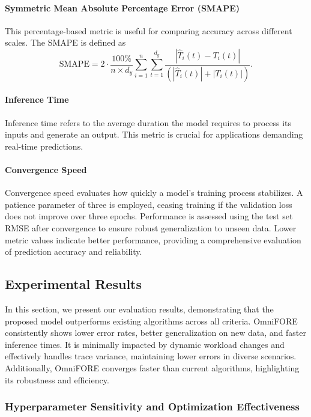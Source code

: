 \paragraph*{Symmetric Mean Absolute Percentage Error (SMAPE)}
This percentage-based metric is useful for comparing accuracy across different scales. The SMAPE is defined as
\begin{equation}
  \text{SMAPE} = 2 \cdot \frac{100\%}{n \times d_y} \sum_{i=1}^{n} \sum_{t=1}^{d_y} \frac{\left| \hat{T}_i(t) - T_i(t) \right|}{\left( \left| \hat{T}_i(t) \right| + \left| T_i(t) \right| \right)}.
\end{equation}

\paragraph*{Inference Time}
Inference time refers to the average duration the model requires to process its inputs and generate an output. This metric is crucial for applications demanding real-time predictions.

\paragraph*{Convergence Speed}
Convergence speed evaluates how quickly a model's training process stabilizes. A patience parameter of three is employed, ceasing training if the validation loss does not improve over three epochs. Performance is assessed using the test set RMSE after convergence to ensure robust generalization to unseen data. Lower metric values indicate better performance, providing a comprehensive evaluation of prediction accuracy and reliability.

\subsection{Experimental Results}
\label{sec: Experimental Results}

In this section, we present our evaluation results, demonstrating that the proposed model outperforms existing algorithms across all criteria. OmniFORE consistently shows lower error rates, better generalization on new data, and faster inference times. It is minimally impacted by dynamic workload changes and effectively handles trace variance, maintaining lower errors in diverse scenarios. Additionally, OmniFORE converges faster than current algorithms, highlighting its robustness and efficiency.

\subsubsection{\textbf{Hyperparameter Sensitivity and Optimization Effectiveness}}


